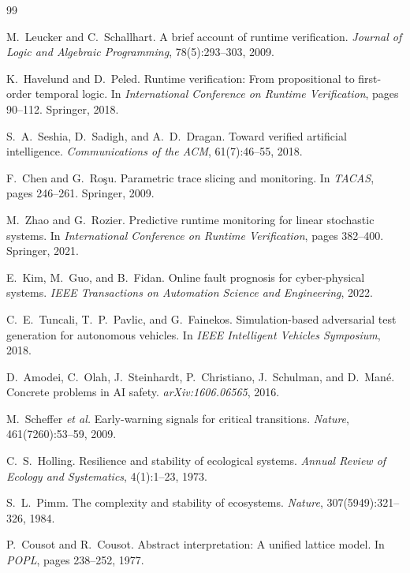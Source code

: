 \documentclass{llncs}
\begin{document}
{\small
\begin{thebibliography}{99}

M.~Leucker and C.~Schallhart.
A brief account of runtime verification.
\textit{Journal of Logic and Algebraic Programming}, 78(5):293--303, 2009.

K.~Havelund and D.~Peled.
Runtime verification: From propositional to first-order temporal logic.
In \textit{International Conference on Runtime Verification}, pages 90--112.
Springer, 2018.

S.~A.~Seshia, D.~Sadigh, and A.~D.~Dragan.
Toward verified artificial intelligence.
\textit{Communications of the ACM}, 61(7):46--55, 2018.

F.~Chen and G.~Ro\c{s}u.
Parametric trace slicing and monitoring.
In \textit{TACAS}, pages 246--261. Springer, 2009.

M.~Zhao and G.~Rozier.
Predictive runtime monitoring for linear stochastic systems.
In \textit{International Conference on Runtime Verification}, pages 382--400.
Springer, 2021.

E.~Kim, M.~Guo, and B.~Fidan.
Online fault prognosis for cyber-physical systems.
\textit{IEEE Transactions on Automation Science and Engineering}, 2022.

C.~E.~Tuncali, T.~P.~Pavlic, and G.~Fainekos.
Simulation-based adversarial test generation for autonomous vehicles.
In \textit{IEEE Intelligent Vehicles Symposium}, 2018.

D.~Amodei, C.~Olah, J.~Steinhardt, P.~Christiano, J.~Schulman,
and D.~Man{\'e}.
Concrete problems in AI safety.
\textit{arXiv:1606.06565}, 2016.

M.~Scheffer \textit{et al.}
Early-warning signals for critical transitions.
\textit{Nature}, 461(7260):53--59, 2009.

C.~S.~Holling.
Resilience and stability of ecological systems.
\textit{Annual Review of Ecology and Systematics}, 4(1):1--23, 1973.

S.~L.~Pimm.
The complexity and stability of ecosystems.
\textit{Nature}, 307(5949):321--326, 1984.

P.~Cousot and R.~Cousot.
Abstract interpretation: A unified lattice model.
In \textit{POPL}, pages 238--252, 1977.


\end{thebibliography}}
\end{document}

